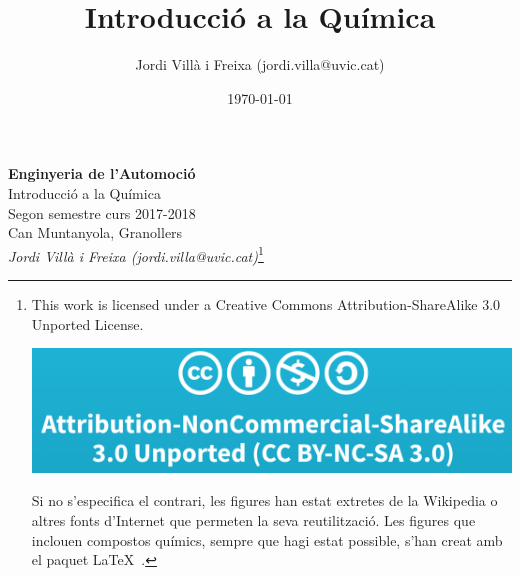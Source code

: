 \documentclass{book}
\title{Introducció a la Química}
\date{\today}
\author{Jordi Vill\`a i Freixa (jordi.villa@uvic.cat)}
\begin{document}
\thispagestyle{empty}

\begin{center}
{\LARGE \bf Enginyeria de l'Automoció}\\
{\large Introducció a la Química}\\
Segon semestre curs 2017-2018\\
Can Muntanyola, Granollers\\
\textit{Jordi Vill\`a i Freixa (jordi.villa@uvic.cat)}\footnote{This work is licensed under a Creative Commons Attribution-ShareAlike 3.0 Unported License.
  \begin{center}
    \includegraphics[scale=0.1]{CC-BY-NC-SA.png}
  \end{center}
  Si no s'especifica el contrari, les figures han estat extretes de la Wikipedia o altres fonts d'Internet que permeten la seva reutilització. Les figures que inclouen compostos químics, sempre que hagi estat possible, s'han creat amb el paquet \LaTeX\ 
    .}
\end{center}


\tableofcontents





%
%
%


%
%
%


%
%


%
%


%
%


%
%
%
\end{document}
